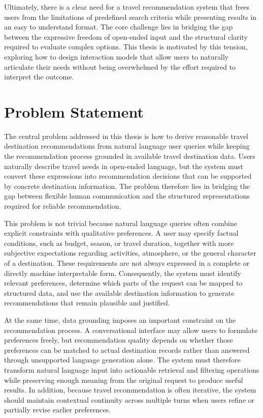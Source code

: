 Ultimately, there is a clear need for a travel recommendation system that frees users from the limitations of predefined search criteria while presenting results in an easy to understand format. The core challenge lies in bridging the gap between the expressive freedom of open-ended input and the structural clarity required to evaluate complex options. This thesis is motivated by this tension, exploring how to design interaction models that allow users to naturally articulate their needs without being overwhelmed by the effort required to interpret the outcome.
\section{Problem Statement}\label{section:introduction:problem-statement}

The central problem addressed in this thesis is how to derive reasonable travel destination recommendations from natural language user queries while keeping the recommendation process grounded in available travel destination data. Users naturally describe travel needs in open-ended language, but the system must convert these expressions into recommendation decisions that can be supported by concrete destination information. The problem therefore lies in bridging the gap between flexible human communication and the structured representations required for reliable recommendation.

This problem is not trivial because natural language queries often combine explicit constraints with qualitative preferences. A user may specify factual conditions, such as budget, season, or travel duration, together with more subjective expectations regarding activities, atmosphere, or the general character of a destination. These requirements are not always expressed in a complete or directly machine interpretable form. Consequently, the system must identify relevant preferences, determine which parts of the request can be mapped to structured data, and use the available destination information to generate recommendations that remain plausible and justified.

At the same time, data grounding imposes an important constraint on the recommendation process. A conversational interface may allow users to formulate preferences freely, but recommendation quality depends on whether those preferences can be matched to actual destination records rather than answered through unsupported language generation alone. The system must therefore transform natural language input into actionable retrieval and filtering operations while preserving enough meaning from the original request to produce useful results. In addition, because travel recommendation is often iterative, the system should maintain contextual continuity across multiple turns when users refine or partially revise earlier preferences.

